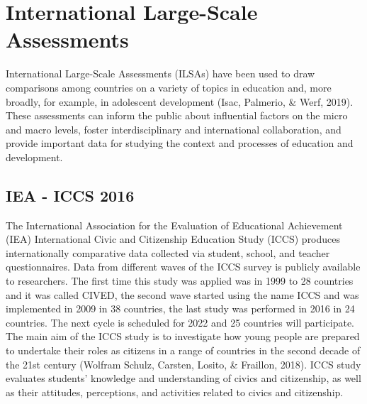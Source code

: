 \documentclass[12pt,a4paper,oneside]{reedthesis}
\begin{document}
\hypertarget{international-large-scale-assessments}{%
\section{International Large-Scale Assessments}\label{international-large-scale-assessments}}

International Large-Scale Assessments (ILSAs) have been used to draw comparisons among countries on a variety of topics in education and, more broadly, for example, in adolescent development (Isac, Palmerio, \& Werf, 2019). These assessments can inform the public about influential factors on the micro and macro levels, foster interdisciplinary and international collaboration, and provide important data for studying the context and processes of education and development.

\hypertarget{iea---iccs-2016}{%
\subsection{IEA - ICCS 2016}\label{iea---iccs-2016}}

The International Association for the Evaluation of Educational Achievement (IEA) International Civic and Citizenship Education Study (ICCS) produces internationally comparative data collected via student, school, and teacher questionnaires. Data from different waves of the ICCS survey is publicly available to researchers. The first time this study was applied was in 1999 to 28 countries and it was called CIVED, the second wave started using the name ICCS and was implemented in 2009 in 38 countries, the last study was performed in 2016 in 24 countries. The next cycle is scheduled for 2022 and 25 countries will participate. The main aim of the ICCS study is to investigate how young people are prepared to undertake their roles as citizens in a range of countries in the second decade of the 21st century (Wolfram Schulz, Carsten, Losito, \& Fraillon, 2018). ICCS study evaluates students' knowledge and understanding of civics and citizenship, as well as their attitudes, perceptions, and activities related to civics and citizenship.
\end{document}
